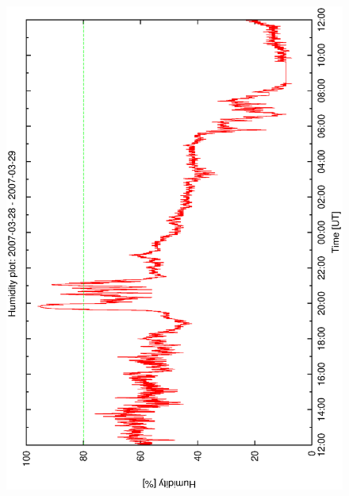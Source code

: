 \begin{figure}[htbp]
\begin{center}
{    \includegraphics[scale=0.25, angle=-90]{figures/ecs/hum_1_2007_03_28.eps}
  }
\end{center}
\end{figure}
